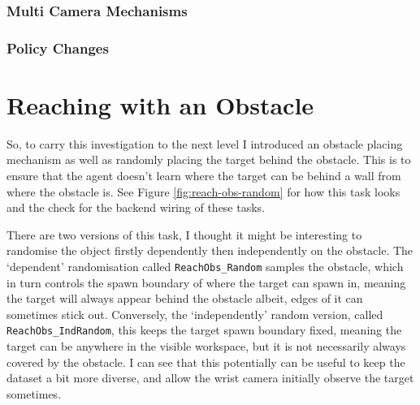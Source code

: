 \subsubsection{Multi Camera Mechanisms}
\subsubsection{Policy Changes}


\section{Reaching with an Obstacle}
So, to carry this investigation to the next level I introduced an obstacle placing mechanism as well as randomly placing the target behind the obstacle. This is to ensure that the agent doesn't learn where the target can be behind a wall from where the obstacle is. See Figure \ref{fig:reach-obs-random} for how this task looks and the check  for the backend wiring of these tasks.

There are two versions of this task, I thought it might be interesting to randomise the object firstly dependently then independently on the obstacle. The `dependent' randomisation called \verb|ReachObs_Random| samples the obstacle, which in turn controls the spawn boundary of where the target can spawn in, meaning the target will always appear behind the obstacle albeit, edges of it can sometimes stick out. Conversely, the `independently' random version, called \verb|ReachObs_IndRandom|, this keeps the target spawn boundary fixed, meaning the target can be anywhere in the visible workspace, but it is not necessarily always covered by the obstacle. I can see that this potentially can be useful to keep the dataset a bit more diverse, and allow the wrist camera initially observe the target sometimes.

